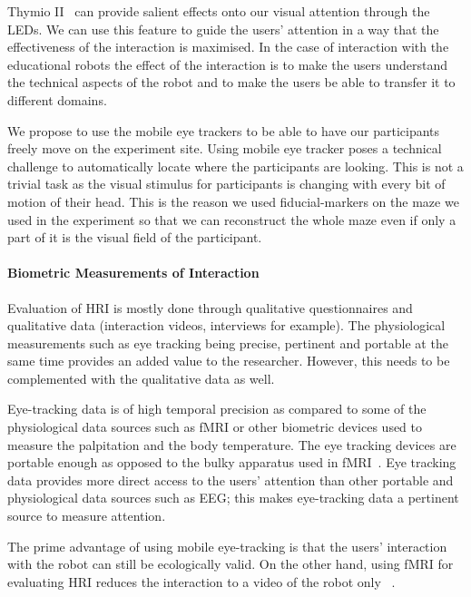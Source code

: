 \documentclass{sig-alternate}
\begin{document}
Thymio II~\cite{riedo2012two} can provide salient effects onto our visual
attention through the LEDs. We can use this feature to guide the users'
attention in a way that the effectiveness of the interaction is maximised. In
the case of interaction with the educational robots the effect of the
interaction is to make the users understand the technical aspects of the robot
and to make the users be able to transfer it to different domains.

We propose to use the mobile eye trackers to be able to have our participants
freely move on the experiment site. Using mobile eye tracker poses a technical
challenge to automatically locate where the participants are looking. This is
not a trivial task as the visual stimulus for participants is changing with
every bit of motion of their head. This is the reason we used fiducial-markers
on the maze we used in the experiment so that we can reconstruct the whole maze
even if only a part of it is the visual field of the participant.


\paragraph{Biometric Measurements of Interaction}



Evaluation of HRI is mostly done through qualitative questionnaires and
qualitative data (interaction videos, interviews for example). The physiological
measurements such as eye tracking being precise, pertinent and portable at the
same time provides an added value to the researcher.  However, this needs to be
complemented with the qualitative data as well.


Eye-tracking data is of high temporal precision as
compared to some of the physiological data sources such as fMRI or other
biometric devices used to measure the palpitation and the body temperature. The
eye tracking devices are portable enough as opposed to the bulky apparatus used
in fMRI~\cite{rosenthal2013neural}.  Eye tracking data provides more direct
access to the users' attention than other portable and physiological data
sources such as EEG; this makes eye-tracking data a pertinent source to measure
attention.

The prime advantage of using mobile eye-tracking is that the users' interaction
with the robot can still be ecologically valid. On the other hand, using fMRI
for evaluating HRI reduces the interaction to a video of the robot only
~\cite{rosenthal2013neural}.
\end{document}
